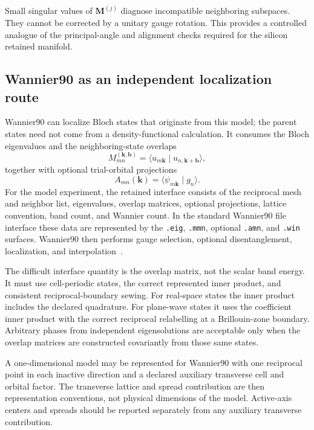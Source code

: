 Small singular values of $\mathbf M^{(j)}$ diagnose incompatible neighboring
subspaces. They cannot be corrected by a unitary gauge rotation. This provides
a controlled analogue of the principal-angle and alignment checks required for
the silicon retained manifold.

\subsection*{Wannier90 as an independent localization route}

Wannier90 can localize Bloch states that originate from this model; the parent
states need not come from a density-functional calculation. It consumes the
Bloch eigenvalues and the neighboring-state overlaps
\begin{equation}
    M_{mn}^{(\mathbf k,\mathbf b)}
    =
    \langle
        u_{m\mathbf k}
        \mid
        u_{n,\mathbf k+\mathbf b}
    \rangle,
\end{equation}
together with optional trial-orbital projections
\begin{equation}
    A_{mn}(\mathbf k)
    =
    \langle
        \psi_{m\mathbf k}
        \mid
        g_n
    \rangle.
\end{equation}
For the model experiment, the retained interface consists of the reciprocal
mesh and neighbor list, eigenvalues, overlap matrices, optional projections,
lattice convention, band count, and Wannier count. In the standard Wannier90
file interface these data are represented by the \texttt{.eig},
\texttt{.mmn}, optional \texttt{.amn}, and \texttt{.win} surfaces. Wannier90
then performs gauge selection, optional disentanglement, localization, and
interpolation~\cite{souza2001,pizzi2020}.

The difficult interface quantity is the overlap matrix, not the scalar band
energy. It must use cell-periodic states, the correct represented inner
product, and consistent reciprocal-boundary sewing. For real-space states the
inner product includes the declared quadrature. For plane-wave states it uses
the coefficient inner product with the correct reciprocal relabelling at a
Brillouin-zone boundary. Arbitrary phases from independent eigensolutions are
acceptable only when the overlap matrices are constructed covariantly from
those same states.

A one-dimensional model may be represented for Wannier90 with one reciprocal
point in each inactive direction and a declared auxiliary transverse cell and
orbital factor. The transverse lattice and spread contribution are then
representation conventions, not physical dimensions of the model. Active-axis
centers and spreads should be reported separately from any auxiliary transverse
contribution.

